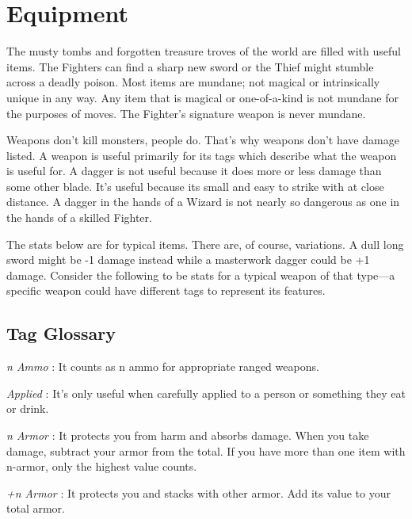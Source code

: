 \chapter{Equipment}
  
            

The musty tombs and forgotten treasure troves of the world are filled with useful items. The Fighters can find a sharp new sword or the Thief might stumble across a deadly poison. Most items are mundane; not magical or intrinsically unique in any way. Any item that is magical or one-of-a-kind is not mundane for the purposes of moves. The Fighter's signature weapon is never mundane.

       

Weapons don't kill monsters, people do. That's why weapons don't have damage listed. A weapon is useful primarily for its tags which describe what the weapon is useful for. A dagger is not useful because it does more or less damage than some other blade. It's useful because its small and easy to strike with at close distance. A dagger in the hands of a Wizard is not nearly so dangerous as one in the hands of a skilled Fighter.

       

The stats below are for typical items. There are, of course, variations. A dull long sword might be -1 damage instead while a masterwork dagger could be +1 damage. Consider the following to be stats for a typical weapon of that type—a specific weapon could have different tags to represent its features.

       
\section{Tag Glossary}    
       

         {\em n Ammo} : It counts as n ammo for appropriate ranged weapons.

       

         {\em Applied} : It's only useful when carefully applied to a person or something they eat or drink.

       

         {\em n Armor} : It protects you from harm and absorbs damage. When you take damage, subtract your armor from the total. If you have more than one item with n-armor, only the highest value counts. 

       

         {\em +n Armor} : It protects you and stacks with other armor. Add its value to your total armor.

